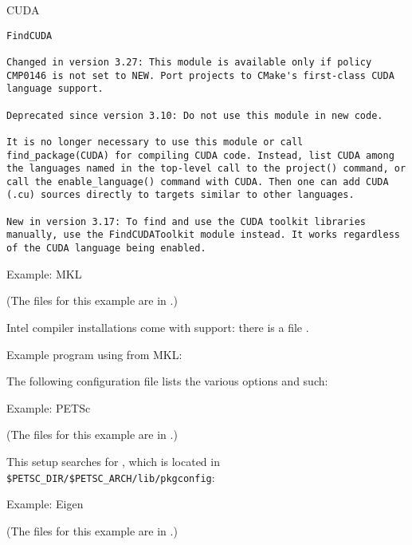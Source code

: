 
 {CUDA}

\begin{verbatim}
FindCUDA

Changed in version 3.27: This module is available only if policy CMP0146 is not set to NEW. Port projects to CMake's first-class CUDA language support.

Deprecated since version 3.10: Do not use this module in new code.

It is no longer necessary to use this module or call find_package(CUDA) for compiling CUDA code. Instead, list CUDA among the languages named in the top-level call to the project() command, or call the enable_language() command with CUDA. Then one can add CUDA (.cu) sources directly to targets similar to other languages.

New in version 3.17: To find and use the CUDA toolkit libraries manually, use the FindCUDAToolkit module instead. It works regardless of the CUDA language being enabled.
\end{verbatim}

 {Example: MKL}

(The files for this example are in .)

Intel compiler installations come with  support:
there is a file .

Example program using  from MKL:


The following configuration file lists the various options and such:
%



 {Example: PETSc}

(The files for this example are in .)

This  setup searches for ,
which is located in \verb+$PETSC_DIR/$PETSC_ARCH/lib/pkgconfig+:
%



 {Example: Eigen}

(The files for this example are in .)

